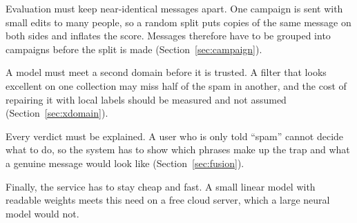 Evaluation must keep near-identical messages apart. One campaign is sent with small edits to many people, so a random split puts copies of the same message on both sides and inflates the score. Messages therefore have to be grouped into campaigns before the split is made (Section~\ref{sec:campaign}).

A model must meet a second domain before it is trusted. A filter that looks excellent on one collection may miss half of the spam in another, and the cost of repairing it with local labels should be measured and not assumed (Section~\ref{sec:xdomain}).

Every verdict must be explained. A user who is only told ``spam'' cannot decide what to do, so the system has to show which phrases make up the trap and what a genuine message would look like (Section~\ref{sec:fusion}).

Finally, the service has to stay cheap and fast. A small linear model with readable weights meets this need on a free cloud server, which a large neural model would not.
